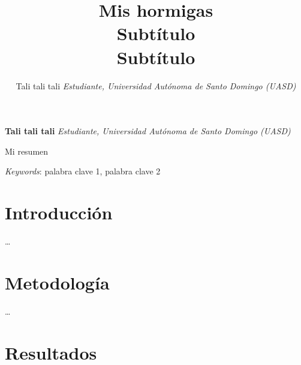\documentclass[11pt,]{article}
\title{Mis hormigas\\
Subtítulo\\
Subtítulo  }
\author{\Large Tali tali tali\vspace{0.05in} \newline\normalsize\emph{Estudiante, Universidad Autónoma de Santo Domingo (UASD)}  }
\date{}
\newcommand*{\authorfont}{\fontfamily{phv}\selectfont}
\renewenvironment{abstract}
 {{%
    \setlength{\leftmargin}{0mm}
    \setlength{\rightmargin}{\leftmargin}%
  }%
  \relax}
 {\endlist}
\begin{document}
	
%

{%
\setlength{\parindent}{0pt}
\thispagestyle{plain}
{\fontsize{18}{20}\selectfont\raggedright 
\maketitle  %

}

{
   \vskip 13.5pt\relax \normalsize\fontsize{11}{12} 
\textbf{\authorfont Tali tali tali} \hskip 15pt \emph{\small Estudiante, Universidad Autónoma de Santo Domingo (UASD)}   

}

}








\begin{abstract}

    \hbox{\vrule height .2pt width 39.14pc}

    \vskip 8.5pt %

\noindent Mi resumen


\vskip 8.5pt \noindent \emph{Keywords}: palabra clave 1, palabra clave 2 \par

    \hbox{\vrule height .2pt width 39.14pc}



\end{abstract}


\vskip 6.5pt


\noindent  \hypertarget{introducciuxf3n}{%
\section{Introducción}\label{introducciuxf3n}}

\ldots

\hypertarget{metodologuxeda}{%
\section{Metodología}\label{metodologuxeda}}

\ldots

\hypertarget{resultados}{%
\section{Resultados}\label{resultados}}
\end{document}

